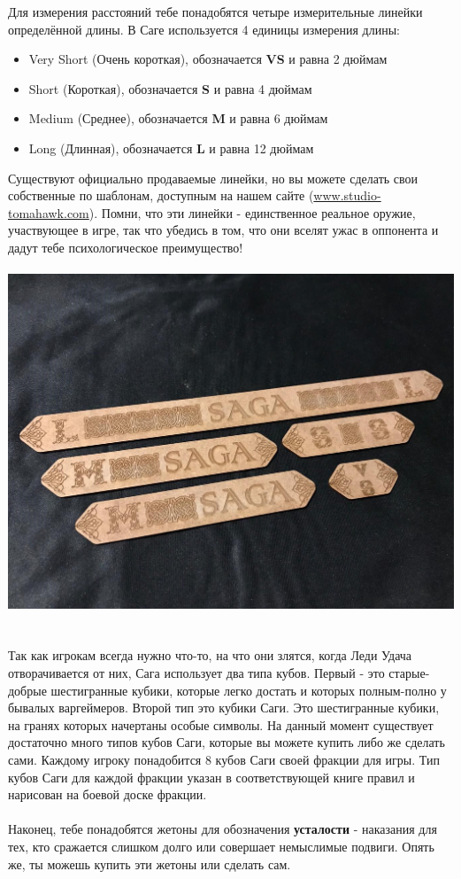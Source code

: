 \documentclass[a4paper,11pt,twoside]{article}
\begin{document}
Для измерения расстояний тебе понадобятся четыре измерительные линейки определённой длины. В Саге используется 4 единицы измерения длины: \begin{itemize}
\item Very Short (Очень короткая), обозначается \textbf{VS} и равна 2 дюймам
\item Short (Короткая), обозначается \textbf{S} и равна 4 дюймам
\item Medium (Среднее), обозначается \textbf{M} и равна 6 дюймам
\item Long (Длинная), обозначается \textbf{L} и равна 12 дюймам 
\end{itemize}
Существуют официально продаваемые линейки, но вы можете сделать свои собственные по шаблонам, доступным на нашем сайте (\url{www.studio-tomahawk.com}). Помни, что эти линейки - единственное реальное оружие, участвующее в игре, так что убедись в том, что они вселят ужас в оппонента и дадут тебе психологическое преимущество! \\ \\
\includegraphics[width=1.0\textwidth]{pics/SagaSticks} \\ \\ \\
Так как игрокам всегда нужно что-то, на что они злятся, когда Леди Удача отворачивается от них, Сага использует два типа кубов. Первый - это старые-добрые шестигранные кубики, которые легко достать и которых полным-полно у бывалых варгеймеров. Второй тип это кубики Саги. Это шестигранные кубики, на гранях которых начертаны особые символы. На данный момент существует достаточно много типов кубов Саги, которые вы можете купить либо же сделать сами. Каждому игроку понадобится 8 кубов Саги своей фракции для игры. Тип кубов Саги для каждой фракции указан в соответствующей книге правил и нарисован на боевой доске фракции. \\ \\
Наконец, тебе понадобятся жетоны для обозначения \textbf{усталости} - наказания для тех, кто сражается слишком долго или совершает немыслимые подвиги. Опять же, ты можешь купить эти жетоны или сделать сам.
\end{document}
